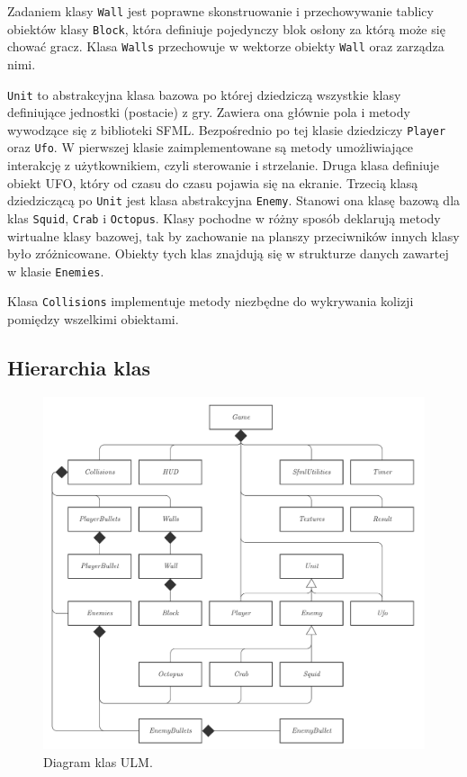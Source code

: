 \documentclass[12pt,a4paper]{article}
\begin{document}
Zadaniem klasy \lstinline|Wall| jest poprawne skonstruowanie i przechowywanie tablicy obiektów klasy \lstinline|Block|, która definiuje pojedynczy blok osłony za którą może się chować gracz. Klasa \lstinline|Walls| przechowuje w wektorze obiekty \lstinline|Wall| oraz zarządza nimi.

\lstinline|Unit| to abstrakcyjna klasa bazowa po której dziedziczą wszystkie klasy definiujące jednostki (postacie) z gry. Zawiera ona głównie pola i metody wywodzące się z biblioteki SFML. Bezpośrednio po tej klasie dziedziczy \lstinline|Player| oraz \lstinline|Ufo|. W pierwszej klasie zaimplementowane są metody umożliwiające interakcję z użytkownikiem, czyli sterowanie i strzelanie. Druga klasa definiuje obiekt UFO, który od czasu do czasu pojawia się na ekranie. Trzecią klasą dziedziczącą po \lstinline|Unit| jest klasa abstrakcyjna \lstinline|Enemy|. Stanowi ona klasę bazową dla klas \lstinline|Squid|, \lstinline|Crab|  i \lstinline|Octopus|.  Klasy pochodne w różny sposób deklarują metody wirtualne klasy bazowej, tak by zachowanie na planszy przeciwników innych klasy było zróżnicowane. Obiekty tych klas znajdują się w strukturze danych zawartej w klasie \lstinline|Enemies|. 

Klasa \lstinline|Collisions| implementuje metody niezbędne do wykrywania kolizji pomiędzy wszelkimi obiektami.
\subsection{Hierarchia klas}

\begin{figure}[h]
\centering
\includegraphics[width=14cm]{ULM}
\caption{ \centering Diagram klas ULM.}
\label{fig:interface}
\end{figure} 
\end{document}

